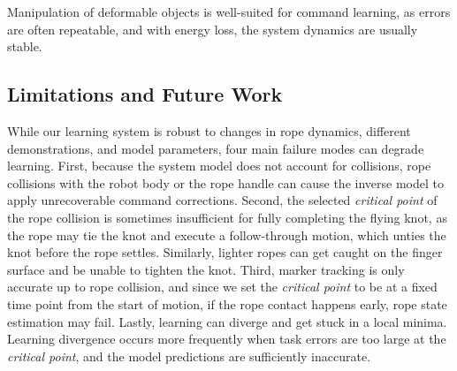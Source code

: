 \documentclass[conference]{IEEEtran}
\begin{document}
Manipulation of deformable objects is well-suited for command learning, as errors are often repeatable, and with energy loss, the system dynamics are usually stable.


\subsection{Limitations and Future Work}
While our learning system is robust to changes in rope dynamics, different demonstrations, and model parameters, four main failure modes can degrade learning. First, because the system model does not account for collisions, rope collisions with the robot body or the rope handle can cause the inverse model to apply unrecoverable command corrections. Second, the selected \textit{critical point} of the rope collision is sometimes insufficient for fully completing the flying knot, as the rope may tie the knot and execute a follow-through motion, which unties the knot before the rope settles. Similarly, lighter ropes can get caught on the finger surface and be unable to tighten the knot. Third, marker tracking is only accurate up to rope collision, and since we set the \textit{critical point} to be at a fixed time point from the start of motion, if the rope contact happens early, rope state estimation may fail. Lastly, learning can diverge and get stuck in a local minima. Learning divergence occurs more frequently when task errors are too large at the \textit{critical point}, and the model predictions are sufficiently inaccurate.
\end{document}
